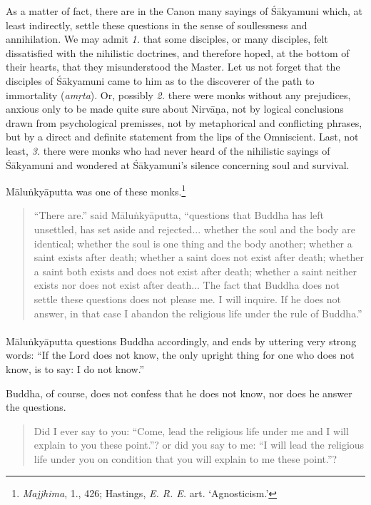 \documentclass[a4paper, 11pt, oneside, english, landscape]{article}
\begin{document}
As a matter of fact, there are in the Canon many sayings of Śākyamuni which, at least indirectly, settle these questions in the sense of soullessness and annihilation. We may admit \emph{1.} that some disciples, or many disciples, felt dissatisfied with the nihilistic doctrines, and therefore hoped, at the bottom of their hearts, that they misunderstood the Master. Let us not forget that the disciples of Śākyamuni came to him as to the discoverer of the path to immortality (\emph{amṛta}). Or, possibly \emph{2.} there were monks without any prejudices, anxious only to be made quite sure about Nirvāṇa, not by logical conclusions drawn from psychological premisses, not by metaphorical and conflicting phrases, but by a direct and definite statement from the lips of the Omniscient. Last, not least, \emph{3.} there were monks who had never heard of the nihilistic sayings of Śākyamuni and wondered at Śākyamuni's silence concerning soul and survival.

Māluṅkyāputta was one of these monks.\footnote{\emph{Majjhima}, 1., 426; Hastings, \emph{E. R. E.} art. `Agnosticism.'}
\begin{quotation}
\small
``There are.'' said Māluṅkyāputta, ``questions that Buddha has left unsettled, has set aside and rejected... whether the soul and the body are identical; whether the soul is one thing and the body another; whether a saint exists after death; whether a saint does not exist after death; whether a saint both exists and does not exist after death; whether a saint neither exists nor does not exist after death... The fact that Buddha does not settle these questions does not please me. I will inquire. If he does not answer, in that case I abandon the religious life under the rule of Buddha.''
\end{quotation}
\paragraph{}
Māluṅkyāputta questions Buddha accordingly, and ends by uttering very strong words: ``If the Lord does not know, the only upright thing for one who does not know, is to say: I do not know.''

Buddha, of course, does not confess that he does not know, nor does he answer the questions.
\begin{quotation}
\small
Did I ever say to you: ``Come, lead the religious life under me and I will explain to you these point.''? or did you say to me: ``I will lead the religious life under you on condition that you will explain to me these point.''?
\end{quotation}
\end{document}
